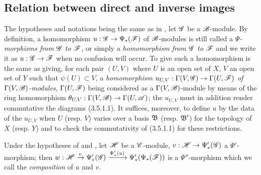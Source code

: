 \subsection{Relation between direct and inverse images}
\label{subsection-relation-between-direct-and-inverse-images}

\begin{env}[4.4.1]
\label{0.4.4.1}
The hypotheses and notations being the same as in , let
$\mathscr{G}$ be a $\mathscr{B}$-module. By definition, a homomorphism
$u:\mathscr{G}\to\Psi_*(\mathscr{F})$ of $\mathscr{B}$-modules is still called a
\emph{$\Psi$-morphisms from $\mathscr{G}$ to $\mathscr{F}$}, or simply a
\emph{homomorphism from $\mathscr{G}$ to $\mathscr{F}$} and we write it as
$u:\mathscr{G}\to\mathscr{F}$ when no confusion will occur. To give such a homomorphism is
the same as giving, for each pair $(U,V)$ where $U$ is an open set of $X$, $V$
an open set of $Y$ such that $\psi(U)\subset V$, a \emph{homomorphism
$u_{U,V}:\Gamma(V,\mathscr{G})\to\Gamma(U,\mathscr{F})$ of $\Gamma(V,\mathscr{B})$-modules},
$\Gamma(U,\mathscr{F})$ being considered as a $\Gamma(V,\mathscr{B})$-module by means of
the ring homomorphism $\theta_{U,V}:\Gamma(V,\mathscr{B})\to\Gamma(U,\mathscr{A})$; the
$u_{U,V}$ must in addition render commutative the diagrams (3.5.1.1). It
suffices, moreover, to define $u$ by the data of the $u_{U,V}$ when $U$
(resp. $V$) varies over a basis $\mathfrak{B}$ (resp. $\mathfrak{B}'$) for the
topology of $X$ (resp. $Y$) and to check the commutativity of (3.5.1.1) for
these restrictions.
\end{env}

\begin{env}[4.4.2]
\label{0.4.4.2}
Under the hypotheses of  and , let $\mathscr{H}$ be
a $\mathscr{C}$-module, $v:\mathscr{H}\to\Psi_*'(\mathscr{G})$ a $\Psi'$-morphism; then
$w:\mathscr{H}\xrightarrow{v}\Psi_*'(\mathscr{G})\xrightarrow{\Psi_*'(u)}\Psi_*'(\Psi_*(\mathscr{F}))$
is a $\Psi''$-morphism which we call the \emph{composition} of $u$ and $v$.
\end{env}


